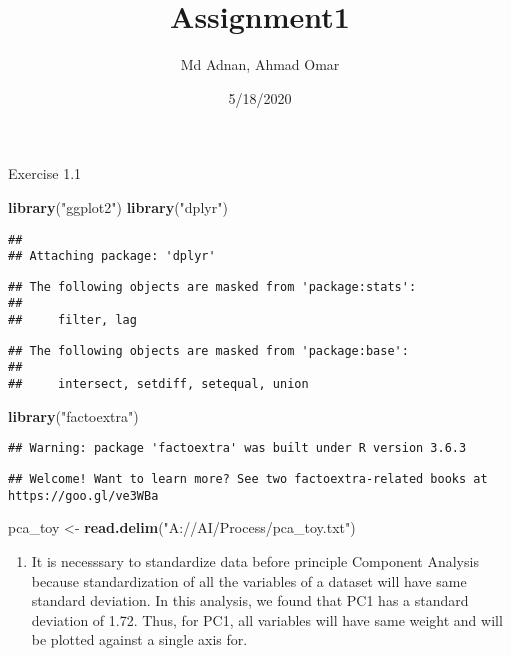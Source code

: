 \documentclass[]{article}
\title{Assignment1}
\author{Md Adnan, Ahmad Omar}
\date{5/18/2020}
\newenvironment{Shaded}{\begin{snugshade}}{\end{snugshade}}
\newcommand{\KeywordTok}[1]{\textcolor[rgb]{0.13,0.29,0.53}{\textbf{#1}}}
\newcommand{\NormalTok}[1]{#1}
\newcommand{\StringTok}[1]{\textcolor[rgb]{0.31,0.60,0.02}{#1}}
\providecommand{\tightlist}{%
  \setlength{\itemsep}{0pt}\setlength{\parskip}{0pt}}
\begin{document}
\maketitle

Exercise 1.1

\begin{Shaded}
\begin{Highlighting}[]
\KeywordTok{library}\NormalTok{(}\StringTok{"ggplot2"}\NormalTok{)}
\KeywordTok{library}\NormalTok{(}\StringTok{"dplyr"}\NormalTok{)}
\end{Highlighting}
\end{Shaded}

\begin{verbatim}
## 
## Attaching package: 'dplyr'
\end{verbatim}

\begin{verbatim}
## The following objects are masked from 'package:stats':
## 
##     filter, lag
\end{verbatim}

\begin{verbatim}
## The following objects are masked from 'package:base':
## 
##     intersect, setdiff, setequal, union
\end{verbatim}

\begin{Shaded}
\begin{Highlighting}[]
\KeywordTok{library}\NormalTok{(}\StringTok{"factoextra"}\NormalTok{)}
\end{Highlighting}
\end{Shaded}

\begin{verbatim}
## Warning: package 'factoextra' was built under R version 3.6.3
\end{verbatim}

\begin{verbatim}
## Welcome! Want to learn more? See two factoextra-related books at https://goo.gl/ve3WBa
\end{verbatim}

\begin{Shaded}
\begin{Highlighting}[]
\NormalTok{pca_toy <-}\StringTok{ }\KeywordTok{read.delim}\NormalTok{(}\StringTok{"A://AI/Process/pca_toy.txt"}\NormalTok{)}
\end{Highlighting}
\end{Shaded}

\begin{enumerate}
\def\labelenumi{(\alph{enumi})}
\tightlist
\item
  It is necesssary to standardize data before principle Component
  Analysis because standardization of all the variables of a dataset
  will have same standard deviation. In this analysis, we found that PC1
  has a standard deviation of 1.72. Thus, for PC1, all variables will
  have same weight and will be plotted against a single axis for.
\end{enumerate}
\end{document}
